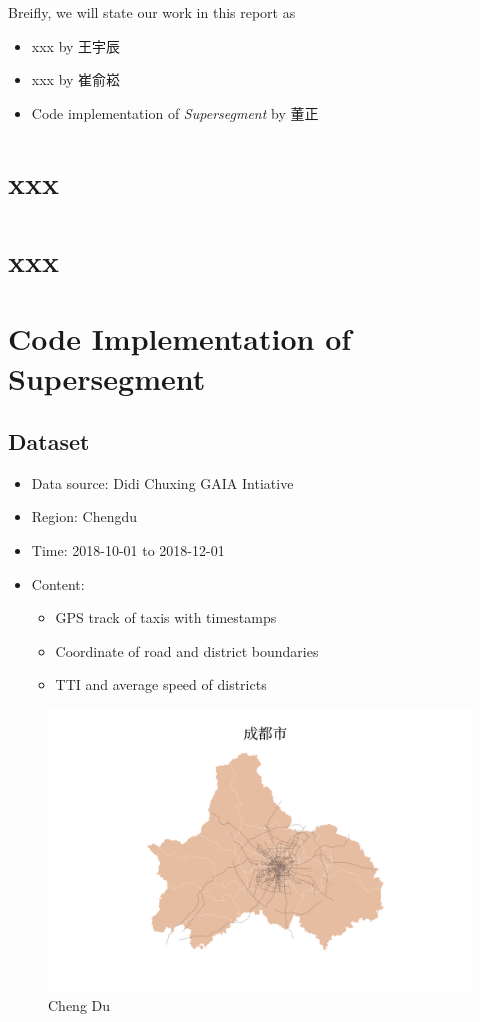 \documentclass[fontset=none]{ctexart}
\theoremstyle{definition}
\theoremstyle{remark}
\begin{document}
Breifly, we will state our work in this report as
\begin{itemize}
    \item xxx by 王宇辰
    \item xxx by 崔俞崧
    \item Code implementation of \textit{Supersegment} by 董正
\end{itemize}

\clearpage
\section{xxx}

\clearpage
\section{xxx}

\clearpage
\section{Code Implementation of Supersegment}
\subsection{Dataset}
\begin{itemize}
    \item Data source: Didi Chuxing GAIA Intiative
    \item Region: Chengdu
    \item Time: 2018-10-01 to 2018-12-01
    \item Content:
        \begin{itemize}
            \item GPS track of taxis with timestamps
            \item Coordinate of road and district boundaries
            \item TTI and average speed of districts
        \end{itemize}
\end{itemize}
\begin{figure}[htb]
  \centering
  \includegraphics[width=\textwidth]{images/成都市.png}
  \caption{Cheng Du}
  \label{fig: chengdu}
\end{figure}
\end{document}
